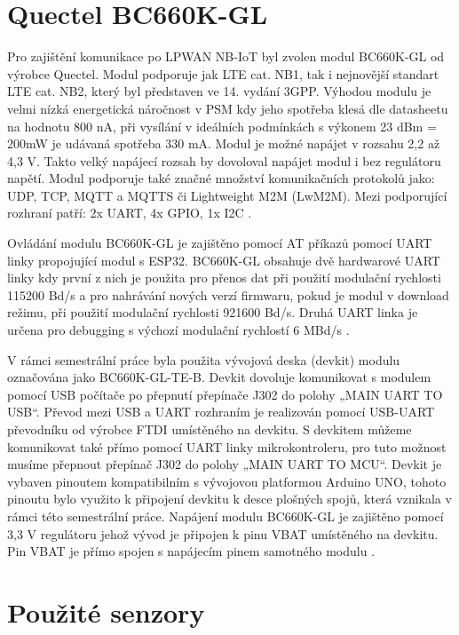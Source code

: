 \section{Quectel BC660K-GL}
\par Pro zajištění komunikace po LPWAN NB-IoT byl zvolen modul BC660K-GL od výrobce Quectel. Modul podporuje jak LTE cat. NB1, tak i nejnovější standart LTE cat. NB2, který byl představen ve 14. vydání 3GPP. Výhodou modulu je velmi nízká energetická náročnost v PSM kdy jeho spotřeba klesá dle datasheetu na hodnotu 800 nA, při vysílání v ideálních podmínkách s výkonem 23 dBm = 200mW je udávaná spotřeba 330 mA. Modul je možné napájet v rozsahu 2,2 až 4,3 V. Takto velký napájecí rozsah by dovoloval napájet modul i bez regulátoru napětí. Modul podporuje také značné množství komunikačních protokolů jako: UDP, TCP, MQTT a MQTTS či Lightweight M2M (LwM2M). Mezi podporující rozhraní patří: 2x UART, 4x GPIO, 1x I2C \cite{Xe6siNg2rhN8gnWj}.
\par Ovládání modulu BC660K-GL je zajištěno pomocí AT příkazů pomocí UART linky propojující modul s ESP32. BC660K-GL obsahuje dvě hardwarové UART linky kdy první z nich je použita pro přenos dat při použití modulační rychlosti 115200 Bd/s a pro nahrávání nových verzí firmwaru, pokud je modul v download režimu, při použití modulační rychlosti 921600 Bd/s. Druhá UART linka je určena pro debugging s výchozí modulační rychlostí 6 MBd/s \cite{A41W1voJqm9eaVoi}.
\par V rámci semestrální práce byla použita vývojová deska (devkit) modulu označována jako BC660K-GL-TE-B. Devkit dovoluje komunikovat s modulem pomocí USB počítače po přepnutí přepínače J302 do polohy „MAIN UART TO USB“. Převod mezi USB a UART rozhraním je realizován pomocí USB-UART převodníku od výrobce FTDI umístěného na devkitu. S devkitem můžeme komunikovat také přímo pomocí UART linky mikrokontroleru, pro tuto možnost musíme přepnout přepínač J302 do polohy „MAIN UART TO MCU“. Devkit je vybaven pinoutem kompatibilním s vývojovou platformou Arduino UNO, tohoto pinoutu bylo využito k připojení devkitu k desce plošných spojů, která vznikala v rámci této semestrální práce. Napájení modulu BC660K-GL je zajištěno pomocí 3,3 V regulátoru jehož vývod je připojen k pinu VBAT umístěného na devkitu. Pin VBAT je přímo spojen s napájecím pinem samotného modulu \cite{Ive1rMH0mThtXUvO}.

\section{Použité senzory}
